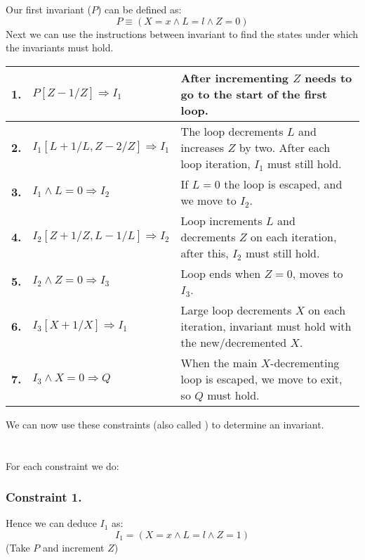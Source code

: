 \documentclass{report}
\begin{document}
\begin{itemize}
{	
	Our first invariant ($P$) can be defined as:
	\[P \equiv (X =x  \land L = l \land Z = 0)\]
	Next we can use the instructions between invariant to find the states under which the invariants must hold.
	\begin{center}
		\begin{tabular}{l l p{}}
			\textbf{1.} & $P[Z-1/Z] \Rightarrow I_1$              & After incrementing $Z$ needs to go to the start of the first loop.                                  \\
			\hline
			\textbf{2.} & $I_1[L + 1/L, Z - 2/Z] \Rightarrow I_1$ & The loop decrements $L$ and increases $Z$ by two. After each loop iteration, $I_1$ must still hold. \\
			\hline
			\textbf{3.} & $I_1 \land L = 0 \Rightarrow I_2$       & If $L = 0$ the loop is escaped, and we move to $I_2$.                                               \\
			\hline
			\textbf{4.} & $I_2[Z+1/Z,L-1/L] \Rightarrow I_2$      & Loop increments $L$ and decrements $Z$ on each iteration, after this, $I_2$ must still hold.        \\
			\hline
			\textbf{5.} & $I_2 \land Z = 0 \Rightarrow I_3$       & Loop ends when $Z = 0$, moves to $I_3$.                                                             \\
			\hline
			\textbf{6.} & $I_3[X+1/X] \Rightarrow I_1$            & Large loop decrements $X$ on each iteration, invariant must hold with the new/decremented $X$.      \\
			\hline
			\textbf{7.} & $I_3 \land X = 0 \Rightarrow Q$         & When the main $X$-decrementing loop is escaped, we move to exit, so $Q$ must hold.
		\end{tabular}
	\end{center}
	We can now use these constraints (also called ) to determine an invariant.
	\\
	\\
	\\ For each constraint we do:

	      \subsubsection*{Constraint 1.}
	      Hence we can deduce $I_1$ as:
	      \[I_1 = (X = x \land L = l \land Z = 1)\]
	      (Take $P$ and increment $Z$)
}
\end{itemize}
\end{document}
